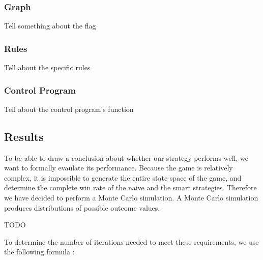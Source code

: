 \subsubsection{Graph}
Tell something about the flag

\subsubsection{Rules}
Tell about the specific rules

\subsubsection{Control Program}
Tell about the control program's function

\subsection{Results}
To be able to draw a conclusion about whether our strategy performs well, we want to formally evaulate its performance.
Because the game is relatively complex, it is impossible to generate the entire state space of the game, and determine the complete win rate of the naive and the smart strategies.
Therefore we have decided to perform a Monte Carlo simulation. A Monte Carlo simulation produces distributions of possible outcome values.

\vspace{6pt}

TODO

To determine the number of iterations needed to meet these requirements, we use the following formula \cite{sim-modeling}:

